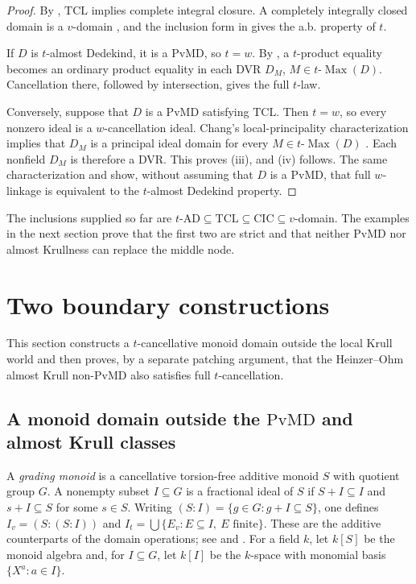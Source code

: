 \documentclass[11pt]{amsart}
\theoremstyle{definition}
\theoremstyle{remark}
\newcommand{\PvMD}{\mathrm{PvMD}}
\newcommand{\TCL}{\mathrm{TCL}}
\newcommand{\CIC}{\mathrm{CIC}}
\newcommand{\tAD}{t\text{-}\mathrm{AD}}
\newcommand{\tMax}{t\text{-}\operatorname{Max}}
\begin{document}
\begin{proof}
By , $\TCL$ implies complete integral closure.  A completely
integrally closed domain is a $v$-domain
\cite{AndersonAndersonFontanaZafrullah}, and the inclusion form
in  gives the a.b. property of $t$.

If $D$ is $t$-almost Dedekind, it is a $\PvMD$, so $t=w$.
By , a $t$-product equality becomes an ordinary
product equality in each DVR $D_M$, $M\in\tMax(D)$.  Cancellation there,
followed by intersection, gives the full $t$-law.

Conversely, suppose that $D$ is a $\PvMD$ satisfying $\TCL$.  Then $t=w$,
so every nonzero ideal is a $w$-cancellation ideal.  Chang's
local-principality characterization implies that $D_M$ is a principal
ideal domain for every $M\in\tMax(D)$ \cite{ChangCancellation}.  Each
nonfield $D_M$ is therefore a DVR.  This proves (iii), and (iv) follows.
The same characterization and  show, without
assuming that $D$ is a $\PvMD$, that full $w$-linkage is equivalent to the
$t$-almost Dedekind property.
\end{proof}

The inclusions supplied so far are
$\tAD\subseteq\TCL\subseteq\CIC\subseteq v$-domain.  The examples in the
next section prove that the first two are strict and that neither $\PvMD$ nor
almost Krullness can replace the middle node.

\section{Two boundary constructions}\label{sec:examples}

This section constructs a $t$-cancellative monoid domain outside the local
Krull world and then proves, by a separate patching argument, that the
Heinzer--Ohm almost Krull non-$\PvMD$ also satisfies full $t$-cancellation.

\subsection{A monoid domain outside the \texorpdfstring{$\PvMD$}{PvMD} and almost Krull classes}

A \emph{grading monoid} is a cancellative torsion-free additive monoid $S$
with quotient group $G$.  A nonempty subset $I\subseteq G$ is a fractional
ideal of $S$ if $S+I\subseteq I$ and $s+I\subseteq S$ for some $s\in S$.
Writing $(S:I)=\{g\in G:g+I\subseteq S\}$, one defines
$I_v=(S:(S:I))$ and
$I_t=\bigcup\{E_v:E\subseteq I,\ E\text{ finite}\}$.  These are the additive
counterparts of the domain operations; see \cite{GilmerSemigroupRings} and
\cite{HalterKoch}.  For a field $k$, let $k[S]$ be the monoid algebra and,
for $I\subseteq G$, let $k[I]$ be the $k$-space with monomial basis
$\{X^a:a\in I\}$.
\end{document}
